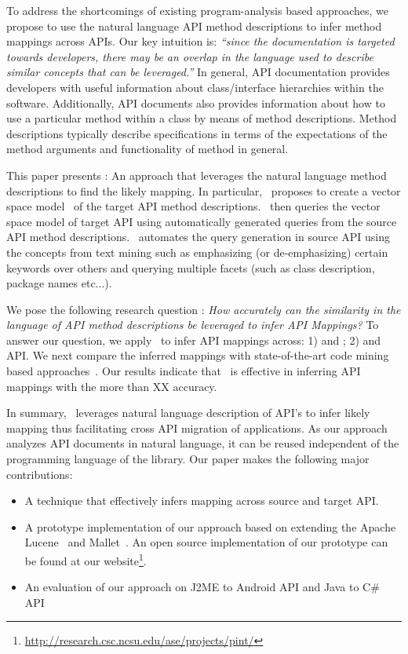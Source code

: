 To address the shortcomings of existing program-analysis based approaches,
we propose to use the natural language API method descriptions
to infer method mappings across APIs.
Our key intuition is:
\textit{``since the documentation is targeted towards developers,
	there may be an overlap in the language used to describe similar concepts that can be leveraged.''}
In general, API documentation provides developers with useful information
about class/interface hierarchies within the software.
Additionally, API documents also provides information about
how to use a particular method within a class by means of method descriptions.
Method descriptions typically describe specifications in terms of
the expectations of the method arguments and functionality of method in general.


This paper presents  \tool : An approach that leverages the natural language method descriptions to find the likely mapping.
In particular, \tool\ proposes to create a vector space model~\cite{singhal2001modern,manning2008introduction} of the target API method descriptions. 
\tool\ then queries the vector space model of target API using  
automatically generated queries from the source API method descriptions.
\tool\ automates the query generation in source API using the concepts from text mining such as emphasizing (or de-emphasizing) certain keywords over others and querying multiple facets (such as class description, package names etc...).


We pose the following research question :
\textit{How accurately can the similarity in the language of API method descriptions
	be leveraged to infer API Mappings?}
To answer our question, we apply \tool\ to infer API mappings across:
1)  and ; 2)  and  API.
We next compare the inferred mappings with state-of-the-art code mining based approaches~\cite{nguyen2014statistical,Gokhale2013ICSE}.
Our results indicate that \tool\ is effective in inferring API mappings with the more than XX accuracy.

In summary, \tool\ leverages natural language description of API's to infer likely mapping thus facilitating cross API migration of applications. As our approach analyzes API documents in natural language, it can be reused independent of the programming language of the library. Our paper makes the following major contributions:
\begin{itemize}
	\item A technique that effectively infers mapping across source and target API.
	\item A prototype implementation of our approach based on extending the Apache Lucene~\cite{lucene} and Mallet~\cite{mccallum2002mallet}.
	An open source implementation of our prototype can be found at our website\footnote{\url{http://research.csc.ncsu.edu/ase/projects/pint/}}. 
	\item An evaluation of our approach on J2ME to Android API and Java to C\# API
\end{itemize}


